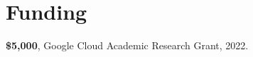\section{Funding}
 \resumeSubHeadingListStart
    \item
      {\textbf{\$5,000}, Google Cloud Academic Research Grant, 2022.}
 \resumeSubHeadingListEnd